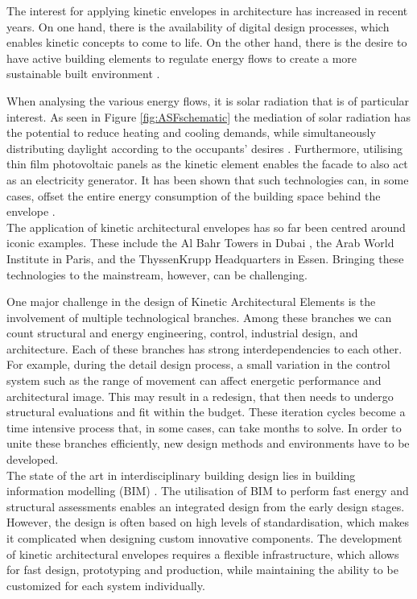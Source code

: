 
The interest for applying kinetic envelopes in architecture has increased in recent years. On one hand, there is the availability of digital design processes, which enables kinetic concepts to come to life. On the other hand, there is the desire to have active building elements to regulate energy flows to create a more sustainable built environment \cite{loonen2013climate}. 

When analysing the various energy flows, it is solar radiation that is of particular interest. As seen in Figure \ref{fig:ASFschematic} the mediation of solar radiation has the potential to reduce heating and cooling demands, while simultaneously distributing daylight according to the occupants' desires \cite{nagy2016adaptive}. Furthermore, utilising thin film photovoltaic panels as the kinetic element enables the facade to also act as an electricity generator. It has been shown that such technologies can, in some cases, offset the entire energy consumption of the building space behind the envelope \cite{jayathissa2017optimising}. \\

The application of kinetic architectural envelopes has so far been centred around iconic examples. These include the Al Bahr Towers in Dubai \cite{oborn2012bahr}, the Arab World Institute in Paris, and the ThyssenKrupp Headquarters in Essen. Bringing these technologies to the mainstream, however, can be challenging. 

One major challenge in the design of Kinetic Architectural Elements is the involvement of multiple technological branches. Among these branches we can count structural and energy engineering, control, industrial design, and architecture. Each of these branches has strong interdependencies to each other. For example, during the detail design process, a small variation in the control system such as the range of movement can affect energetic performance and architectural image. This may result in a redesign, that then needs to undergo structural evaluations and fit within the budget. These iteration cycles become a time intensive process that, in some cases, can take months to solve. In order to unite these branches efficiently, new design methods and environments have to be developed. \\

The state of the art in interdisciplinary building design lies in building information modelling (BIM) \cite{schlueter2009building, volk2014building}. The utilisation of BIM to perform fast energy and structural assessments enables an integrated design from the early design stages. However, the design is often based on high levels of standardisation, which makes it complicated when designing custom innovative components. The development of kinetic architectural envelopes requires a flexible infrastructure, which allows for fast design, prototyping and production, while maintaining the ability to be customized for each system individually. 

